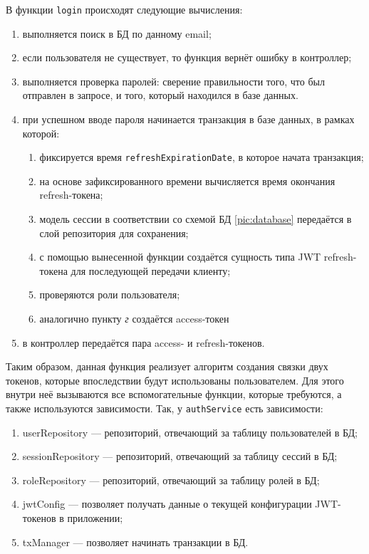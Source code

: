 \documentclass[diploma]{SCWorks}
\begin{document}
В функции \texttt{login} происходят следующие вычисления:
\begin{enumerate}
    \item выполняется поиск в БД по данному email;
    \item если пользователя не существует, то функция вернёт ошибку в контроллер;
    \item выполняется проверка паролей: сверение правильности того, что был 
    отправлен в запросе, и того, который находился в базе данных.
    \item при успешном вводе пароля начинается транзакция в базе данных, в 
    рамках которой:
    \begin{enumerate}
        \item фиксируется время \texttt{refreshExpirationDate}, в которое 
        начата транзакция;
        \item на основе зафиксированного времени вычисляется время окончания 
        refresh-токена;
        \item модель сессии в соответствии со схемой БД \ref{pic:database} 
        передаётся в слой репозитория для сохранения; 
        \item с помощью вынесенной функции создаётся сущность типа JWT 
        refresh-токена для последующей передачи клиенту;
        \item проверяются роли пользователя;
        \item аналогично пункту \textit{г} создаётся access-токен
    \end{enumerate}
    \item в контроллер передаётся пара access- и refresh-токенов.
\end{enumerate}

Таким образом, данная функция реализует алгоритм создания связки двух токенов,
которые впоследствии будут использованы пользователем. Для этого внутри неё
вызываются все вспомогательные функции, которые требуются, а также используются
зависимости. Так, у \texttt{authService} есть зависимости:
\begin{enumerate}
    \item userRepository — репозиторий, отвечающий за таблицу пользователей в БД;
	\item sessionRepository — репозиторий, отвечающий за таблицу сессий в БД;
	\item roleRepository — репозиторий, отвечающий за таблицу ролей в БД;
	\item jwtConfig — позволяет получать данные о текущей конфигурации
    JWT-токенов в приложении;
	\item txManager — позволяет начинать транзакции в БД.
\end{enumerate}
\end{document}
